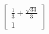 \documentclass[preview]{standalone}
\begin{document}
\begin{align*}
\left[\begin{matrix} \frac{1}{3} + \frac{\sqrt{34}}{3} \\ 1 \end{matrix}\right]
\end{align*}
\end{document}
